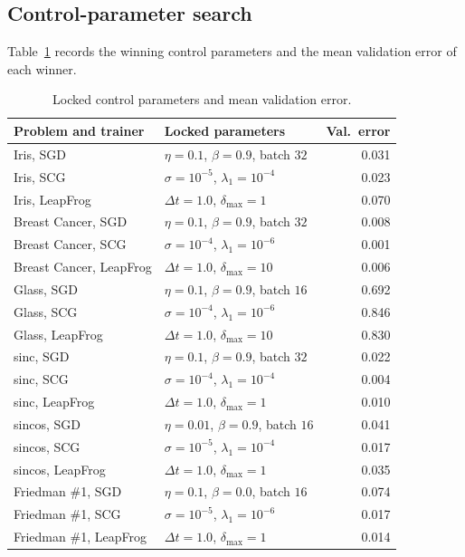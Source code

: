 \documentclass[conference,10pt]{IEEEtran}
\begin{document}
\subsection{Control-parameter search}
\label{sec:res-cp}
Table~\ref{tab:params} records the winning control parameters and the mean validation error of each winner.

\begin{table}[H]
\caption{Locked control parameters and mean validation error.}
\label{tab:params}
\begin{center}
\begin{tabular}{llr}
\toprule
Problem and trainer & Locked parameters & Val.\ error \\
\midrule
Iris, SGD & $\eta=0.1$, $\beta=0.9$, batch $32$ & 0.031 \\
Iris, SCG & $\sigma=10^{-5}$, $\lambda_{1}=10^{-4}$ & 0.023 \\
Iris, LeapFrog & $\Delta t=1.0$, $\delta_{\max}=1$ & 0.070 \\
Breast Cancer, SGD & $\eta=0.1$, $\beta=0.9$, batch $32$ & 0.008 \\
Breast Cancer, SCG & $\sigma=10^{-4}$, $\lambda_{1}=10^{-6}$ & 0.001 \\
Breast Cancer, LeapFrog & $\Delta t=1.0$, $\delta_{\max}=10$ & 0.006 \\
Glass, SGD & $\eta=0.1$, $\beta=0.9$, batch $16$ & 0.692 \\
Glass, SCG & $\sigma=10^{-4}$, $\lambda_{1}=10^{-6}$ & 0.846 \\
Glass, LeapFrog & $\Delta t=1.0$, $\delta_{\max}=10$ & 0.830 \\
sinc, SGD & $\eta=0.1$, $\beta=0.9$, batch $32$ & 0.022 \\
sinc, SCG & $\sigma=10^{-4}$, $\lambda_{1}=10^{-4}$ & 0.004 \\
sinc, LeapFrog & $\Delta t=1.0$, $\delta_{\max}=1$ & 0.010 \\
sincos, SGD & $\eta=0.01$, $\beta=0.9$, batch $16$ & 0.041 \\
sincos, SCG & $\sigma=10^{-5}$, $\lambda_{1}=10^{-4}$ & 0.017 \\
sincos, LeapFrog & $\Delta t=1.0$, $\delta_{\max}=1$ & 0.035 \\
Friedman \#1, SGD & $\eta=0.1$, $\beta=0.0$, batch $16$ & 0.074 \\
Friedman \#1, SCG & $\sigma=10^{-5}$, $\lambda_{1}=10^{-6}$ & 0.017 \\
Friedman \#1, LeapFrog & $\Delta t=1.0$, $\delta_{\max}=1$ & 0.014 \\
\bottomrule
\end{tabular}
\end{center}
\end{table}
\end{document}
